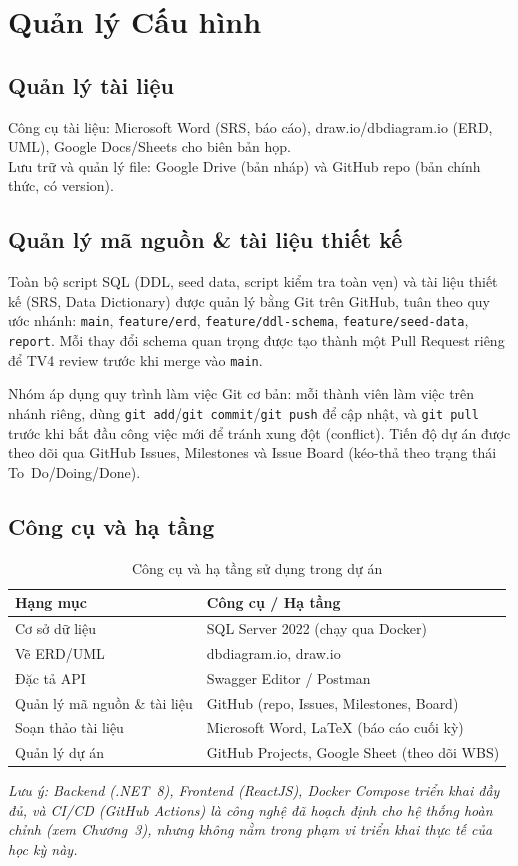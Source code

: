 \section{Quản lý Cấu hình}

\subsection{Quản lý tài liệu}
Công cụ tài liệu: Microsoft Word (SRS, báo cáo), draw.io/dbdiagram.io (ERD, UML), Google Docs/Sheets cho biên bản họp.\\
Lưu trữ và quản lý file: Google Drive (bản nháp) và GitHub repo (bản chính thức, có version).

\subsection{Quản lý mã nguồn \& tài liệu thiết kế}
Toàn bộ script SQL (DDL, seed data, script kiểm tra toàn vẹn) và tài liệu thiết kế (SRS, Data Dictionary) được quản lý bằng Git trên GitHub, tuân theo quy ước nhánh: \texttt{main}, \texttt{feature/erd}, \texttt{feature/ddl-schema}, \texttt{feature/seed-data}, \texttt{report}. Mỗi thay đổi schema quan trọng được tạo thành một Pull Request riêng để TV4 review trước khi merge vào \texttt{main}.

Nhóm áp dụng quy trình làm việc Git cơ bản: mỗi thành viên làm việc trên nhánh riêng, dùng \texttt{git add}/\texttt{git commit}/\texttt{git push} để cập nhật, và \texttt{git pull} trước khi bắt đầu công việc mới để tránh xung đột (conflict). Tiến độ dự án được theo dõi qua GitHub Issues, Milestones và Issue Board (kéo-thả theo trạng thái To~Do/Doing/Done).

\subsection{Công cụ và hạ tầng}
\begin{table}[htbp]
    \centering
    \small
    \caption{Công cụ và hạ tầng sử dụng trong dự án}
    \begin{tabular}{|p{3.5cm}|p{9cm}|}
        \hline
        \textbf{Hạng mục} & \textbf{Công cụ / Hạ tầng} \\
        \hline
        Cơ sở dữ liệu & SQL Server 2022 (chạy qua Docker) \\
        \hline
        Vẽ ERD/UML & dbdiagram.io, draw.io \\
        \hline
        Đặc tả API & Swagger Editor / Postman \\
        \hline
        Quản lý mã nguồn \& tài liệu & GitHub (repo, Issues, Milestones, Board) \\
        \hline
        Soạn thảo tài liệu & Microsoft Word, LaTeX (báo cáo cuối kỳ) \\
        \hline
        Quản lý dự án & GitHub Projects, Google Sheet (theo dõi WBS) \\
        \hline
    \end{tabular}
\end{table}

\textit{Lưu ý: Backend (.NET~8), Frontend (ReactJS), Docker Compose triển khai đầy đủ, và CI/CD (GitHub Actions) là công nghệ đã hoạch định cho hệ thống hoàn chỉnh (xem Chương~3), nhưng không nằm trong phạm vi triển khai thực tế của học kỳ này.}
